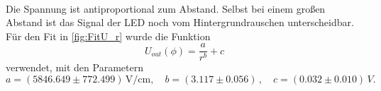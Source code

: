 \\
Die Spannung ist antiproportional zum Abstand. Selbst bei einem großen Abstand ist das Signal der LED noch vom Hintergrundrauschen unterscheidbar.
Für den Fit in \autoref{fig:FitU_r} wurde die Funktion 
\begin{equation*}
   U_{out}(\phi) = \frac{a}{r^b} + c
\end{equation*}
verwendet, mit den Parametern
\begin{equation*}
   a = (5846.649 \pm 772.499) \,\unit{\V\per\centi\m} , \quad b = (3.117 \pm 0.056) \, , \quad c = (0.032 \pm 0.010) \,\unit{V}.
\end{equation*}

\newpage